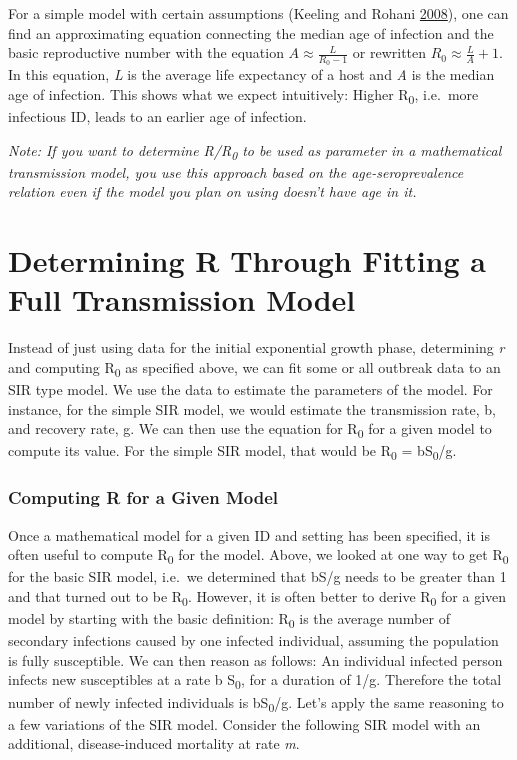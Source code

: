 \documentclass[]{book}
\theoremstyle{definition}
\theoremstyle{definition}
\theoremstyle{definition}
\theoremstyle{remark}
\begin{document}
For a simple model with certain assumptions (Keeling and Rohani
\protect\hyperlink{ref-keeling08}{2008}), one can find an approximating
equation connecting the median age of infection and the basic
reproductive number with the equation \(A \approx \frac {L}{R_0 - 1}\)
or rewritten \(R_0 \approx \frac{L}{A} + 1\). In this equation, \emph{L}
is the average life expectancy of a host and \emph{A} is the median age
of infection. This shows what we expect intuitively: Higher
R\textsubscript{0}, i.e.~more infectious ID, leads to an earlier age of
infection.

\emph{Note: If you want to determine R/R\textsubscript{0} to be used as
parameter in a mathematical transmission model, you use this approach
based on the age-seroprevalence relation even if the model you plan on
using doesn't have age in it.}

\section{Determining R Through Fitting a Full Transmission
Model}\label{determining-r-through-fitting-a-full-transmission-model}

Instead of just using data for the initial exponential growth phase,
determining \emph{r} and computing R\textsubscript{0} as specified
above, we can fit some or all outbreak data to an SIR type model. We use
the data to estimate the parameters of the model. For instance, for the
simple SIR model, we would estimate the transmission rate, b, and
recovery rate, g. We can then use the equation for R\textsubscript{0}
for a given model to compute its value. For the simple SIR model, that
would be R\textsubscript{0} = bS\textsubscript{0}/g.

\subsubsection{Computing R for a Given Model}\label{myadvancedbox}

Once a mathematical model for a given ID and setting has been specified,
it is often useful to compute R\textsubscript{0} for the model. Above,
we looked at one way to get R\textsubscript{0} for the basic SIR model,
i.e.~we determined that bS/g needs to be greater than 1 and that turned
out to be R\textsubscript{0}. However, it is often better to derive
R\textsubscript{0} for a given model by starting with the basic
definition: R\textsubscript{0} is the average number of secondary
infections caused by one infected individual, assuming the population is
fully susceptible. We can then reason as follows: An individual infected
person infects new susceptibles at a rate b S\textsubscript{0}, for a
duration of 1/g. Therefore the total number of newly infected
individuals is bS\textsubscript{0}/g. Let's apply the same reasoning to
a few variations of the SIR model. Consider the following SIR model with
an additional, disease-induced mortality at rate \emph{m}.
\end{document}
